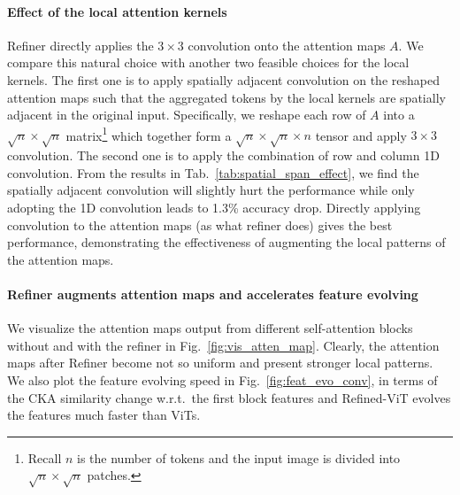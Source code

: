\paragraph{Effect of the local attention kernels }  
Refiner directly applies  
the $3\times 3$ convolution   onto the attention maps $A$.
We compare this natural choice with another two feasible choices for the local kernels. The first one is to  apply spatially adjacent convolution on the  reshaped attention maps such that  the aggregated tokens by the local kernels  are spatially adjacent in the original input. Specifically,  
we reshape each row of $A$ into a $\sqrt{n} \times \sqrt{n}$ matrix\footnote{Recall $n$ is the number of tokens and the input image is divided into $\sqrt{n} \times \sqrt{n}$ patches.}  which together form a  $\sqrt{n} \times \sqrt{n} \times n $ tensor and apply $3\times 3$ convolution.  
The second one is to apply the combination of row and column 1D convolution. From the results in Tab.~\ref{tab:spatial_span_effect},   we find the spatially adjacent convolution will slightly hurt the performance while only adopting the 1D convolution   leads to 1.3\% accuracy drop. Directly applying convolution to the attention maps (as what refiner does) gives the best performance, demonstrating the effectiveness of augmenting the local patterns of the attention maps.

















\paragraph{Refiner augments attention maps and accelerates feature evolving} We visualize the attention maps output from different self-attention blocks without and with the refiner in Fig.~\ref{fig:vis_atten_map}. Clearly, the attention maps after Refiner become not so uniform and present stronger local patterns. We also plot the feature evolving speed in Fig.~\ref{fig:feat_evo_conv},  in terms of the CKA similarity change w.r.t.\ the first block features and Refined-ViT evolves the features much faster than ViTs.

